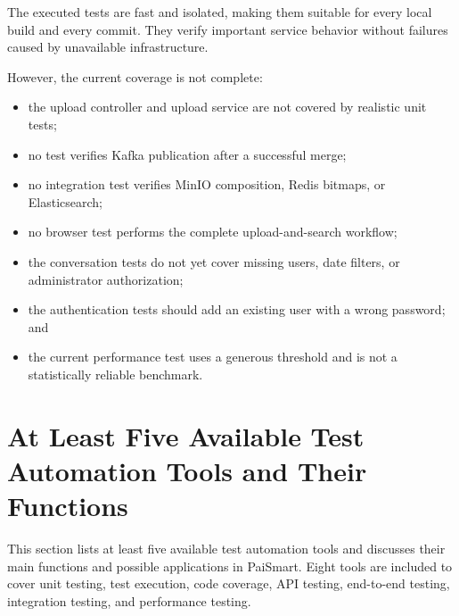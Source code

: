 \documentclass[11pt,a4paper]{article}
\begin{document}
The executed tests are fast and isolated, making them suitable for every local build
and every commit. They verify important service behavior without failures caused by
unavailable infrastructure.

However, the current coverage is not complete:
\begin{itemize}[leftmargin=2em]
  \item the upload controller and upload service are not covered by realistic unit tests;
  \item no test verifies Kafka publication after a successful merge;
  \item no integration test verifies MinIO composition, Redis bitmaps, or Elasticsearch;
  \item no browser test performs the complete upload-and-search workflow;
  \item the conversation tests do not yet cover missing users, date filters, or
        administrator authorization;
  \item the authentication tests should add an existing user with a wrong password; and
  \item the current performance test uses a generous threshold and is not a statistically
        reliable benchmark.
\end{itemize}

\section{At Least Five Available Test Automation Tools and Their Functions}

This section lists at least five available test automation tools and discusses their
main functions and possible applications in PaiSmart. Eight tools are included to
cover unit testing, test execution, code coverage, API testing, end-to-end testing,
integration testing, and performance testing.
\end{document}
